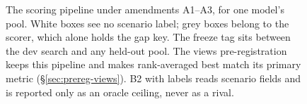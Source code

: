 \begin{figure}[tbp]
\caption{The scoring pipeline under amendments A1--A3, for one model's pool.
White boxes see no scenario label; grey boxes belong to the scorer, which alone
holds the gap key.
The freeze tag sits between the dev search and
any held-out pool. The views pre-registration keeps this pipeline and makes
rank-averaged best match its primary metric (\S\ref{sec:prereg-views}). B2 with
labels reads scenario fields and is reported only as an oracle ceiling, never as
a rival.}
\label{fig:pipeline}
\end{figure}
